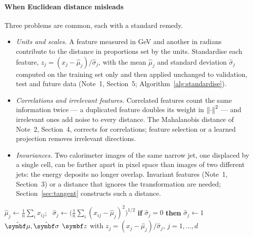 \documentclass[11pt]{article}
\begin{document}
\paragraph{When Euclidean distance misleads} Three problems are common, each with a standard remedy.
\begin{itemize}
\item \emph{Units and scales.} A feature measured in GeV and another in radians contribute to the distance in
proportions set by the units. Standardise each feature, $z_j = (x_j - \hat\mu_j)/\hat\sigma_j$, with the mean
$\hat\mu_j$ and standard deviation $\hat\sigma_j$ computed on the training set only and then applied unchanged to
validation, test and future data (Note~1, Section~5; Algorithm~\ref{alg:standardise}).
\item \emph{Correlations and irrelevant features.} Correlated features count the same information twice --- a
duplicated feature doubles its weight in $\left\lVert \cdot \right\rVert^2$ --- and irrelevant ones add noise to every distance. The
Mahalanobis distance of Note~2, Section~4, corrects for correlations; feature selection or a learned projection
removes irrelevant directions.
\item \emph{Invariances.} Two calorimeter images of the same narrow jet, one displaced by a single cell, can be
farther apart in pixel space than images of two different jets: the energy deposits no longer overlap. Invariant
features (Note~1, Section~3) or a distance that ignores the transformation are needed; Section~\ref{sec:tangent}
constructs such a distance.
\end{itemize}

\begin{algorithm}[htbp]
\caption{Feature standardisation: fit on the training set, apply everywhere (an instance of the \textsc{Fit}/\textsc{Apply} step of Note~1, Section~5)}
\label{alg:standardise}
\begin{algorithmic}[1]
 
    \State $\hat\mu_j \gets \frac{1}{n} \sum_i x_{ij}$; \ $\hat\sigma_j \gets \big(\frac{1}{n} \sum_i (x_{ij} - \hat\mu_j)^2\big)^{1/2}$
    \State \textbf{if} $\hat\sigma_j = 0$ \textbf{then} $\hat\sigma_j \gets 1$ 
  \EndFor
  \State \Return $\hat{\vmu}, \hat{\vect{\sigma}}$
\EndFunction
{} 
  \State \Return $\vect{z}$ with $z_j = (x_j - \hat\mu_j)/\hat\sigma_j$, $j = 1, \dots, d$
\EndFunction
\end{algorithmic}
\end{algorithm}
\end{document}
